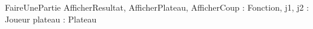 \begin{algorithme}
	\small
	\fonction
	{FaireUnePartie}
	{AfficherResultat, AfficherPlateau, AfficherCoup : Fonction, j1, j2 : Joueur}
	{}
	{plateau : Plateau}
	{
	}
\end{algorithme}
